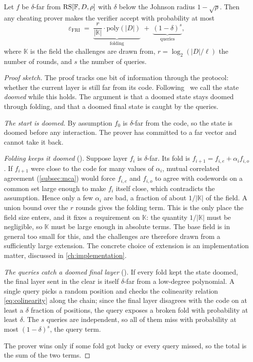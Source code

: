 \begin{theorem}
\label{thm:rbr}
Let $f$ be $\delta$-far from $\mathrm{RS}[\mathbb{F}, D, \rho]$ with $\delta$ below the
Johnson radius $1 - \sqrt{\rho}$. Then any cheating prover makes the
verifier accept with probability at most
%
\[
\varepsilon_{\mathrm{FRI}} \;=\;
\underbrace{\frac{r}{|\mathbb{K}|}\cdot\mathrm{poly}(|D|)}
  _{\text{folding}}
\;+\;
\underbrace{(1 - \delta)^{s}}
  _{\text{queries}} ,
\]
%
where $\mathbb{K}$ is the field the challenges are drawn from,
$r = \log_2(|D|/\ell)$ the number of rounds, and $s$ the number of
queries.
\end{theorem}

\begin{proof}[Proof sketch]
The proof tracks one bit of information through the protocol: whether the
current layer is still far from its code. Following~\cite{GMW25} we call
the state \emph{doomed} while this holds. The argument is that a doomed
state stays doomed through folding, and that a doomed final state is
caught by the queries.

\emph{The start is doomed.} By assumption $f_0$ is $\delta$-far from the
code, so the state is doomed before any interaction. The prover has
committed to a far vector and cannot take it back.

\emph{Folding keeps it doomed} (\cite[Lemma~5.1]{GMW25}). Suppose layer
$f_i$ is $\delta$-far. Its fold is
$f_{i+1} = f_{i,e} + \alpha_i f_{i,o}$. If $f_{i+1}$ were close to the
code for many values of $\alpha_i$, mutual correlated agreement
(\cref{subsec:mca}) would force $f_{i,e}$ and $f_{i,o}$ to agree with
codewords on a common set large enough to make $f_i$ itself close, which
contradicts the assumption. Hence only a few $\alpha_i$ are bad, a
fraction of about $1/|\mathbb{K}|$ of the field. A union bound over the
$r$ rounds gives the folding term. This is the only place the field size
enters, and it fixes a requirement on $\mathbb{K}$: the quantity
$1/|\mathbb{K}|$ must be negligible, so $\mathbb{K}$ must be large enough
in absolute terms. The base field is in general too small for this, and
the challenges are therefore drawn from a sufficiently large extension.
The concrete choice of extension is an implementation matter, discussed
in \cref{ch:implementation}.

\emph{The queries catch a doomed final layer} (\cite[Claim~5.3]{GMW25}).
If every fold kept the state doomed, the final layer sent in the clear is
itself $\delta$-far from a low-degree polynomial. A single query picks a
random position and checks the colinearity relation \cref{eq:colinearity}
along the chain; since the final layer disagrees with the code on at least
a $\delta$ fraction of positions, the query exposes a broken fold with
probability at least $\delta$. The $s$ queries are independent, so all of
them miss with probability at most $(1-\delta)^s$, the query term.

The prover wins only if some fold got lucky or every query missed, so the
total is the sum of the two terms.
\end{proof}

